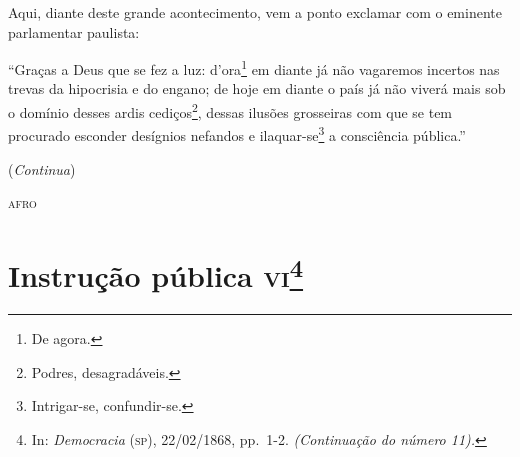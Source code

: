 Aqui, diante deste grande acontecimento, vem a ponto exclamar com o
eminente parlamentar paulista:

``Graças a Deus que se fez a luz: d'ora\footnote{De agora.} em diante
já não vagaremos incertos nas trevas da hipocrisia e do engano; de hoje
em diante o país já não viverá mais sob o domínio desses ardis
cediços\footnote{Podres, desagradáveis.}, dessas ilusões grosseiras
com que se tem procurado esconder desígnios nefandos e
ilaquar-se\footnote{Intrigar-se, confundir-se.} a consciência
pública.''

(\emph{Continua})
\begin{flushright}
\textsc{afro}
\end{flushright}
\chapter{Instrução pública \textsc{vi}\footnote{In: \emph{Democracia} (\textsc{sp}),
  22/02/1868, pp.~1-2. \emph{(Continuação do número 11).}}}

